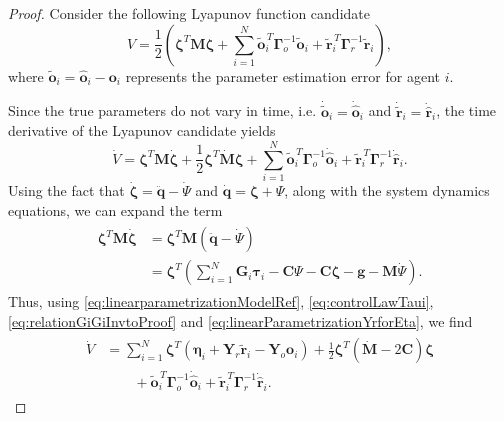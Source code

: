 \begin{proof}
    Consider the following Lyapunov function candidate
    \begin{equation}
        V = \frac{1}{2}\left( \boldsymbol{\zeta}^T \mathbf {M} \boldsymbol{\zeta} + \sum _{i=1}^{N} \widetilde{\mathbf{o}}_i^{\,T} \boldsymbol{\Gamma }_o^{-1}\widetilde{\mathbf{o}}_i + \widetilde{\mathbf{r}}_i^{\,T} \boldsymbol{\Gamma }_r^{-1} \widetilde{\mathbf{r}}_i \right),
    \end{equation}
    where $\widetilde{\mathbf {o}}_i = \hat{\mathbf{o}}_i - \mathbf{o}_i$ represents the parameter estimation error for agent $i$.

    Since the true parameters do not vary in time, i.e. $\dot{\widetilde{\mathbf {o}}}_i = \dot{\hat{\mathbf{o}}}_i$ and $\dot{\widetilde{\mathbf {r}}}_i = \dot{\hat{\mathbf{r}}}_i$, the time derivative of the Lyapunov candidate yields
    \begin{equation}
        \dot{V} = \boldsymbol{\zeta}^T \mathbf{M} \dot{\boldsymbol{\zeta}} + \frac{1}{2} \boldsymbol{\zeta}^T \dot{\mathbf{M}} \boldsymbol{\zeta} + \sum\limits_{i=1}^{N} \widetilde{\mathbf{o}}_i^{\,T} \boldsymbol{\Gamma}_o^{-1} \dot{\hat{\mathbf{o}}}_i + \widetilde{\mathbf{r}}_i^{\,T} \boldsymbol{\Gamma}_r^{-1}\dot{\hat{\mathbf{r}}}_i.
    \end{equation}
    Using the fact that $\dot{\boldsymbol{\zeta}} = \ddot{\mathbf{q}} - \dot{\Psi}$ and $\dot{\mathbf{q}} = \boldsymbol{\zeta} + \Psi$, along with the system dynamics equations, we can expand the term
    \begin{align} 
    \begin{split}
        \boldsymbol{\zeta}^T \mathbf {M} \dot{\boldsymbol{\zeta}} &= \boldsymbol{\zeta}^T\mathbf{M}(\ddot{\mathbf{q}} - \dot{\Psi})\\ 
        &= \boldsymbol{\zeta}^T\left(\textstyle \sum\limits_{i=1}^{N} \mathbf{G}_i\boldsymbol{\tau }_i - \mathbf{C}\Psi - \mathbf{C} \boldsymbol{\zeta} - \mathbf{g} - \mathbf{M}\dot{\Psi}\right).
    \end{split}
    \end{align} 
    Thus, using \eqref{eq:linearparametrizationModelRef}, \eqref{eq:controlLawTaui}, \eqref{eq:relationGiGiInvtoProof} and \eqref{eq:linearParametrizationYrforEta}, we find
    \begin{align}
    \begin{split}
        \dot{V} &= \sum\limits_{i=1}^{N} \boldsymbol{\zeta}^T\left(\boldsymbol{\eta}_i + \mathbf {Y}_r \widetilde{\mathbf {r}}_i - \mathbf {Y}_o \mathbf {o}_i\right) + \frac{1}{2}\boldsymbol{\zeta}^T\left(\dot{\mathbf {M}}-2\mathbf {C}\right)\boldsymbol{\zeta} \!\\ &\quad \quad + \widetilde{\mathbf {o}}_i^{\,T} \boldsymbol{\Gamma }_o^{-1} \dot{\hat{\mathbf {o}}}_i + \widetilde{\mathbf {r}}_i^{\,T} \boldsymbol{\Gamma }_r^{-1}\dot{\hat{\mathbf {r}}}_i. 

\end{split}
\end{align}
\end{proof}
